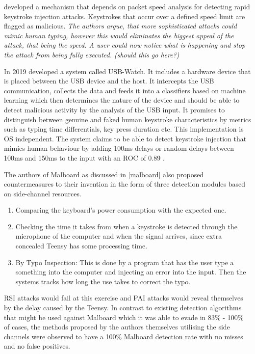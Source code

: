 \cite{neunerUSBlockBlockingUSBBased2018} developed a mechanism that depends on packet speed analysis for detecting rapid keystroke injection attacks. Keystrokes that occur over a defined speed limit are flagged as malicious.\textit{ The authors argue, that more sophisticated attacks could mimic human typing, however this would eliminates the biggest appeal of the attack, that being the speed. A user could now notice what is happening and stop the attack from being fully executed. (should this go here?) }

In 2019 \cite{denneyUSBWatchDynamicHardwareAssisted2019} developed a system called USB-Watch. It includes a hardware device that is placed between the USB device and the host. It intercepts the USB communication, collects the data and feeds it into a classifiers based on machine learning which then determines the nature of the device and should be able to detect malicious activity by the analysis of the USB input. It promises to distinguish between genuine and faked human keystroke characteristics by metrics such as typing time differentials, key press duration etc. This implementation is OS independent. The system claims to be able to detect keystroke injection that mimics human behaviour by adding 100ms delays or random delays between 100ms and 150ms to the input with an ROC of 0.89 . 

The authors of Malboard \cite{farhiMalboardNovelUser2019} as discussed in \ref{malboard} also proposed countermeasures to their invention in the form of three detection modules based on side-channel resources. 
\begin{enumerate}
    \item Comparing the keyboard's power consumption with the expected one.
    \item Checking the time it takes from when a keystroke is detected through the microphone of the computer and when the signal arrives, since extra  concealed Teensy has some processing time.
    \item By Typo Inspection: This is done by a program that has the user type a something into the computer and injecting an error into the input. Then the systems tracks how long the use takes to correct the typo.
\end{enumerate}
RSI attacks would fail at this exercise and PAI attacks would reveal themselves by the delay caused by the Teensy.   
In contrast to existing detection algorithms that might be used against Malboard which it was able to evade in 83\% - 100\% of cases, the methods proposed by the authors themselves utilising the side channels were observed to have a 100\% Malboard detection rate with no misses and no false positives.  

